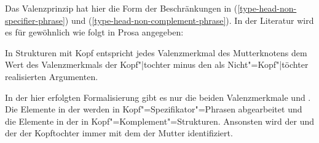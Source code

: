 Das Valenzprinzip hat hier die Form der Beschränkungen in (\ref{type-head-non-specifier-phrase}) und
(\ref{type-head-non-complement-phrase}). In der Literatur wird es für gewöhnlich wie folgt in Prosa
angegeben:
\begin{prinzip-break}[Valenzprinzip]
In Strukturen mit Kopf entspricht jedes Valenzmerkmal des Mutterknotens dem Wert des Valenzmerkmals der Kopf"|tochter
minus den als Nicht"=Kopf"|töchter realisierten Argumenten.
\end{prinzip-break}
In der hier erfolgten Formalisierung gibt es nur die beiden Valenzmerkmale \spr und \comps. Die
Elemente in der \sprl werden in Kopf"=Spezifikator"=Phrasen abgearbeitet und
die Elemente in der \compsl in Kopf"=Komplement"=Strukturen. Ansonsten wird der \sprw und der \compsw
der Kopftochter immer mit dem der Mutter identifiziert.

